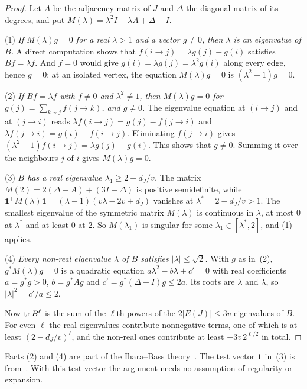 \begin{proof}
Let $A$ be the adjacency matrix of $J$ and $\Delta$ the diagonal matrix of its degrees, and put
$M(\lambda)=\lambda^{2}I-\lambda A+\Delta-I$.

(1) \emph{If $M(\lambda)g=0$ for a real $\lambda>1$ and a vector $g\ne0$, then $\lambda$ is an
eigenvalue of $B$.} A direct computation shows that $f(i\to j)=\lambda g(j)-g(i)$ satisfies
$Bf=\lambda f$. And $f=0$ would give $g(i)=\lambda g(j)=\lambda^{2}g(i)$ along every edge, hence
$g=0$; at an isolated vertex, the equation $M(\lambda)g=0$ is $(\lambda^{2}-1)g=0$.

(2) \emph{If $Bf=\lambda f$ with $f\ne0$ and $\lambda^{2}\ne1$, then $M(\lambda)g=0$ for
$g(j)=\sum_{k\sim j}f(j\to k)$, and $g\ne0$.} The eigenvalue equation at $(i\to j)$ and at
$(j\to i)$ reads $\lambda f(i\to j)=g(j)-f(j\to i)$ and $\lambda f(j\to i)=g(i)-f(i\to j)$.
Eliminating $f(j\to i)$ gives $(\lambda^{2}-1)f(i\to j)=\lambda g(j)-g(i)$. This shows that
$g\ne0$. Summing it over the neighbours $j$ of $i$ gives $M(\lambda)g=0$.

(3) \emph{$B$ has a real eigenvalue $\lambda_1\ge2-d_J/v$.} The matrix
$M(2)=2(\Delta-A)+(3I-\Delta)$ is positive semidefinite, while
$\mathbf{1}^{\!\top}M(\lambda)\mathbf{1}=(\lambda-1)(v\lambda-2v+d_J)$ vanishes at
$\lambda^{*}=2-d_J/v>1$. The smallest eigenvalue of the symmetric matrix $M(\lambda)$ is continuous
in $\lambda$, at most $0$ at $\lambda^{*}$ and at least $0$ at $2$. So $M(\lambda_1)$ is singular for
some $\lambda_1\in[\lambda^{*},2]$, and (1) applies.

(4) \emph{Every non-real eigenvalue $\lambda$ of $B$ satisfies $|\lambda|\le\sqrt2$.} With $g$ as
in~(2), $g^{*}M(\lambda)g=0$ is a quadratic equation $a\lambda^{2}-b\lambda+c'=0$ with real
coefficients $a=g^{*}g>0$, $b=g^{*}Ag$ and $c'=g^{*}(\Delta-I)g\le2a$. Its roots are $\lambda$ and
$\bar\lambda$, so $|\lambda|^{2}=c'/a\le2$.

Now $\operatorname{tr} B^{\ell}$ is the sum of the $\ell$th powers of the $2|E(J)|\le3v$ eigenvalues of $B$. For
even $\ell$ the real eigenvalues contribute nonnegative terms, one of which is at least
$(2-d_J/v)^{\ell}$, and the non-real ones contribute at least $-3v\,2^{\ell/2}$ in total.
\end{proof}

Facts (2) and (4) are part of the Ihara--Bass theory~\cite{Bass,KS}. The test vector $\mathbf{1}$
in~(3) is from~\cite{KNT}. With this test vector the argument needs no assumption of regularity
or expansion.

